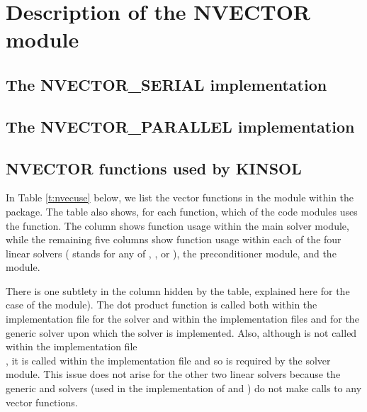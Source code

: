 \chapter{Description of the NVECTOR module}\label{s:nvector}


\section{The NVECTOR\_SERIAL implementation}\label{ss:nvec_ser}


\section{The NVECTOR\_PARALLEL implementation}\label{ss:nvec_par}


\section{NVECTOR functions used by KINSOL}

In Table \ref{t:nvecuse} below, we list the vector functions in the 
{\nvector} module within the {\kinsol} package.
The table also shows, for each function, which of the code modules uses
the function. The {\kinsol} column shows function usage within the main
solver module, while the remaining five columns show function
usage within each of the four {\kinsol} linear solvers ({\kinspils}
stands for any of {\kinspgmr}, {\kinspbcg}, or {\kinsptfqmr}),
the {\kinbbdpre} preconditioner module, and the {\fkinsol} module.

There is one subtlety in the {\kinspils} column hidden by the table,
explained here for the case of the {\kinspgmr} module). The dot product
function  is called both within the 
implementation file  for the {\kinspgmr} solver and within 
the implementation files  and 
for the generic {\spgmr} solver upon which the {\kinspgmr} solver is implemented.
Also, although  is not called within the
implementation file \\
, it is called within the
implementation file  and so is required by the
{\kinspgmr} solver module. This issue does not arise for the other two
{\kinsol} linear solvers because the generic {\dense} and {\band} solvers
(used in the implementation of {\kindense} and {\kinband}) do not make calls
to any vector functions.

